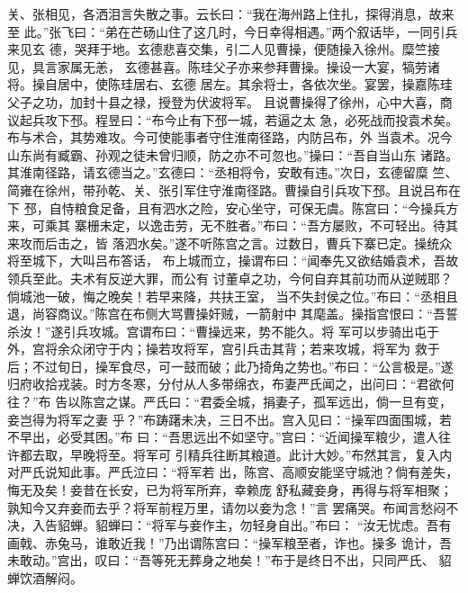 关、张相见，各洒泪言失散之事。云长曰：“我在海州路上住扎，探得消息，故来至
此。”张飞曰：“弟在芒砀山住了这几时，今日幸得相遇。”两个叙话毕，一同引兵来见玄
德，哭拜于地。玄德悲喜交集，引二人见曹操，便随操入徐州。糜竺接见，具言家属无恙，
玄德甚喜。陈珪父子亦来参拜曹操。操设一大宴，犒劳诸将。操自居中，使陈珪居右、玄德
居左。其余将士，各依次坐。宴罢，操嘉陈珪父子之功，加封十县之禄，授登为伏波将军。
且说曹操得了徐州，心中大喜，商议起兵攻下邳。程昱曰：“布今止有下邳一城，若逼之太
急，必死战而投袁术矣。布与术合，其势难攻。今可使能事者守住淮南径路，内防吕布，外
当袁术。况今山东尚有臧霸、孙观之徒未曾归顺，防之亦不可忽也。”操曰：“吾自当山东
诸路。其淮南径路，请玄德当之。”玄德曰：“丞相将令，安敢有违。”次日，玄德留糜
竺、简雍在徐州，带孙乾、关、张引军住守淮南径路。曹操自引兵攻下邳。且说吕布在下
邳，自恃粮食足备，且有泗水之险，安心坐守，可保无虞。陈宫曰：“今操兵方来，可乘其
寨栅未定，以逸击劳，无不胜者。”布曰：“吾方屡败，不可轻出。待其来攻而后击之，皆
落泗水矣。”遂不听陈宫之言。过数日，曹兵下寨已定。操统众将至城下，大叫吕布答话，
布上城而立，操谓布曰：“闻奉先又欲结婚袁术，吾故领兵至此。夫术有反逆大罪，而公有
讨董卓之功，今何自弃其前功而从逆贼耶？倘城池一破，悔之晚矣！若早来降，共扶王室，
当不失封侯之位。”布曰：“丞相且退，尚容商议。”陈宫在布侧大骂曹操奸贼，一箭射中
其麾盖。操指宫恨曰：“吾誓杀汝！”遂引兵攻城。宫谓布曰：“曹操远来，势不能久。将
军可以步骑出屯于外，宫将余众闭守于内；操若攻将军，宫引兵击其背；若来攻城，将军为
救于后；不过旬日，操军食尽，可一鼓而破；此乃掎角之势也。”布曰：“公言极是。”遂
归府收拾戎装。时方冬寒，分付从人多带绵衣，布妻严氏闻之，出问曰：“君欲何往？”布
告以陈宫之谋。严氏曰：“君委全城，捐妻子，孤军远出，倘一旦有变，妾岂得为将军之妻
乎？”布踌躇未决，三日不出。宫入见曰：“操军四面围城，若不早出，必受其困。”布
曰：“吾思远出不如坚守。”宫曰：“近闻操军粮少，遣人往许都去取，早晚将至。将军可
引精兵往断其粮道。此计大妙。”布然其言，复入内对严氏说知此事。严氏泣曰：“将军若
出，陈宫、高顺安能坚守城池？倘有差失，悔无及矣！妾昔在长安，已为将军所弃，幸赖庞
舒私藏妾身，再得与将军相聚；孰知今又弃妾而去乎？将军前程万里，请勿以妾为念！”言
罢痛哭。布闻言愁闷不决，入告貂蝉。貂蝉曰：“将军与妾作主，勿轻身自出。”布曰：
“汝无忧虑。吾有画戟、赤兔马，谁敢近我！”乃出谓陈宫曰：“操军粮至者，诈也。操多
诡计，吾未敢动。”宫出，叹曰：“吾等死无葬身之地矣！”布于是终日不出，只同严氏、
貂蝉饮酒解闷。

